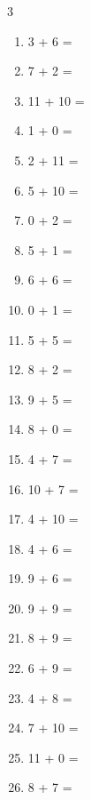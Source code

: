 \documentclass[a4paper, 11pt]{article}
\begin{document}
\begin{multicols}{3}
\begin{enumerate}
      \item 3 + 6 = \dotfill\bigskip
      \item 7 + 2 = \dotfill\bigskip
      \item 11 + 10 = \dotfill\bigskip
      \item 1 + 0 = \dotfill\bigskip
      \item 2 + 11 = \dotfill\bigskip
      \item 5 + 10 = \dotfill\bigskip
      \item 0 + 2 = \dotfill\bigskip
      \item 5 + 1 = \dotfill
      \item 6 + 6 = \dotfill\bigskip
      \item 0 + 1 = \dotfill\bigskip
      \item 5 + 5 = \dotfill\bigskip
      \item 8 + 2 = \dotfill\bigskip
      \item 9 + 5 = \dotfill\bigskip
      \item 8 + 0 = \dotfill\bigskip
      \item 4 + 7 = \dotfill\bigskip
      \item 10 + 7 = \dotfill\bigskip
      \item 4 + 10 = \dotfill\bigskip
      \item 4 + 6 = \dotfill\bigskip
      \item 9 + 6 = \dotfill\bigskip
      \item 9 + 9 = \dotfill\bigskip
      \item 8 + 9 = \dotfill\bigskip
      \item 6 + 9 = \dotfill\bigskip
      \item 4 + 8 = \dotfill\bigskip
      \item 7 + 10 = \dotfill\bigskip
      \item 11 + 0 = \dotfill\bigskip
      \item 8 + 7 = \dotfill
    \end{enumerate}
\end{multicols}
\end{document}
